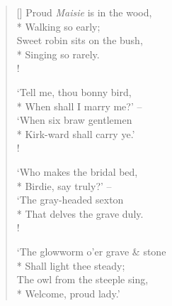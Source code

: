 \documentclass[MAIN]{subfiles}
\begin{document}
\begin{verse}[\versewidth]
Proud \emph{Maisie} is in the wood,\\*
\vin Walking so early;\\
Sweet robin sits on the bush,\\*
\vin Singing so rarely.\\!

`Tell me, thou bonny bird,\\*
\vin When shall I marry me?' --\\
`When six braw gentlemen\\*
\vin Kirk-ward shall carry ye.'\\!

`Who makes the bridal bed,\\*
\vin Birdie, say truly?' --\\
`The gray-headed sexton\\*
\vin That delves the grave duly.\\!

`The glowworm o'er grave \& stone\\*
\vin Shall light thee steady;\\
The owl from the steeple sing,\\*
\vin Welcome, proud lady.'
\end{verse}
\end{document}
